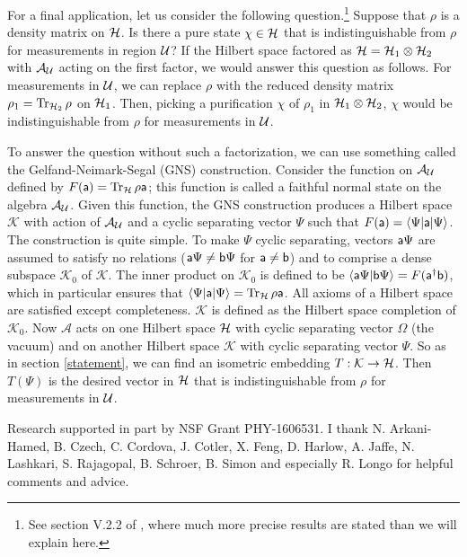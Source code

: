 \documentclass[12pt]{article}
\def\Tr{{\rm Tr}}
\def\K{{\mathcal K}}
\def\a{{\sf a}}
\def\b{{\sf b}}
\def\ra{\rangle}
\def\la{\langle}
\numberwithin{equation}{section}
\def\A{{\mathcal A}}
\begin{document}
For a final application, let us consider the following question.\footnote{See section V.2.2 of \cite{Haag}, where much more
precise results are stated than we will explain here.}  Suppose that $\rho$ is a density  matrix on ${\mathcal H}$.
Is there a pure state $\chi\in{\mathcal H}$ that is indistinguishable from $\rho$ for measurements in region ${\mathcal U}$?    If the Hilbert space
factored as ${\mathcal H}={\mathcal H}_1\otimes {\mathcal H}_2$ with $\A_\U$ acting on the first factor, we would answer this question as follows.
For measurements in ${\mathcal U}$, we can replace $\rho$ with the reduced density matrix $\rho_1=\Tr_{\H_2}\, \rho$ on ${\mathcal H}_1$.
Then, picking a purification $\chi$ of $\rho_1$ in ${\mathcal H}_1\otimes {\mathcal H}_2$, $\chi$ would be indistinguishable from $\rho$
for measurements in ${\mathcal U}$.

To answer the question without such a factorization, we can use something called the Gelfand-Neimark-Segal (GNS) construction.  Consider the function on $\A_\U$ defined
by $F(\a)=\Tr_\H\,\rho\a$; this function  is called a faithful normal state on the algebra $\A_\U$.  Given this function,
the GNS construction produces
a Hilbert space $\K$ with action of  $\A_\U$ and a cyclic separating vector $\Psi$ such that $F(\a)=\la\Psi|\a|\Psi\ra$.     The construction
is quite simple.
To make  $\Psi$  cyclic separating, vectors $\a\Psi$ are assumed to satisfy no relations ($\a\Psi\not=\b\Psi$ for $\a\not=\b$) and to
comprise a dense subspace $\K_0$ of $\K$.
  The inner product on $\K_0$ is defined to be $\la \a\Psi|\b\Psi\ra=F(\a^\dagger \b)$,  which in particular ensures
  that $\la\Psi|\a|\Psi\ra=\Tr_{\H}\,\rho\a$. All axioms of a Hilbert space are satisfied except completeness.  $\K$ is defined as the Hilbert space completion of $\K_0$.  Now $\A$ acts on one Hilbert space ${\mathcal H}$ with cyclic separating vector $\Omega$
(the vacuum) and on another Hilbert space $\K$ with cyclic separating vector $\Psi$.  So as in section \ref{statement}, we can
find an isometric embedding $T:\K\to\H$.  Then $T(\Psi)$ is the desired vector in ${\mathcal H}$ that is indistinguishable from $\rho$
for measurements in ${\mathcal U}$.


Research supported in part by NSF Grant PHY-1606531.    I thank N. Arkani-Hamed, B. Czech, C. Cordova, J. Cotler, X. Feng, D. Harlow, A. Jaffe, N. Lashkari, S. Rajagopal,
B. Schroer,
  B. Simon and especially R. Longo
for helpful comments and advice.

\end{document}
